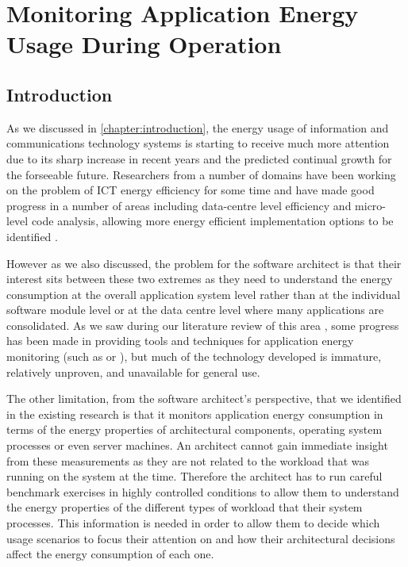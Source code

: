 \chapter{Monitoring Application Energy Usage During Operation}
\label{chapter:monitoring}

\section{Introduction}

As we discussed in \cref{chapter:introduction}, the energy usage of information and communications technology systems is starting to receive much more attention due to its sharp increase in recent years and the predicted continual growth for the forseeable future.  Researchers from a number of domains have been working on the problem of ICT energy efficiency for some time and have made good progress in a number of areas including data-centre level efficiency \cite{dayarathna2016-dcenergy} and micro-level code analysis, allowing more energy efficient implementation options to be identified \cite{noureddine2015-hotspots}.

However as we also discussed, the problem for the software architect is that their interest sits between these two extremes as they need to understand the energy consumption at the overall application system level rather than at the individual software module level or at the data centre level where many applications are consolidated.  As we saw during our literature review of this area , some progress has been made in providing tools and techniques for application energy monitoring (such as \cite{noureddine2015-hotspots} or \cite{phung2017-agnosticpower}), but much of the technology developed is immature, relatively unproven, and unavailable for general use.

The other limitation, from the software architect's perspective, that we identified in the existing research is that it monitors application energy consumption in terms of the energy properties of architectural components, operating system processes or even server machines.  An architect cannot gain immediate insight from these measurements as they are not related to the workload that was running on the system at the time. Therefore the architect has to run careful benchmark exercises in highly controlled conditions to allow them to understand the energy properties of the different types of workload that their system processes. This information is needed in order to allow them to decide which usage scenarios to focus their attention on and how their architectural decisions affect the energy consumption of each one.

